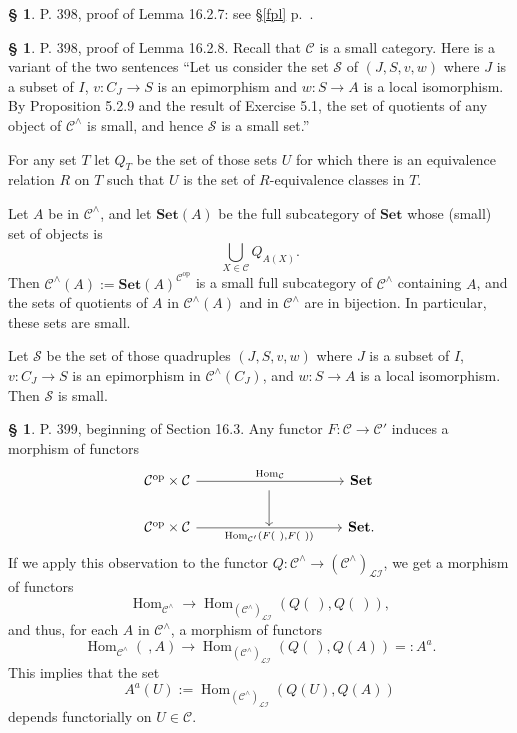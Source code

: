 \documentclass[12pt]{article}%
\theoremstyle{remark}
\theoremstyle{definition}
\newtheorem{s}[thm]{\S}%
\newcommand{\cc}{\mathcal}
\newcommand{\C}{\mathcal C}
\newcommand{\Set}{\mathbf{Set}}
\DeclareMathOperator{\Hom}{Hom}%
\DeclareMathOperator{\op}{op}
\begin{document}
%

\begin{s} 
P. 398, proof of Lemma 16.2.7: see \S\ref{fpl} p.~\pageref{fpl}.
\end{s}


%

\begin{s} 
P. 398, proof of Lemma 16.2.8. Recall that $\C$ is a small category. Here is a variant of the two sentences ``Let us consider the set $\cc S$ of $(J,S,v,w)$ where $J$ is a subset of $I$, $v:C_J\to S$ is an epimorphism and $w:S\to A$ is a local isomorphism. By Proposition 5.2.9 and the result of Exercise 5.1, the set of quotients of any object of $\C^\wedge$ is small, and hence $\cc S$ is a small set.'' 

For any set $T$ let $Q_T$ be the set of those sets $U$ for which there is an equivalence relation $R$ on $T$ such that $U$ is the set of $R$-equivalence classes in $T$. 

Let $A$ be in $\C^\wedge$, and let $\Set(A)$ be the full subcategory of $\Set$ whose (small) set of objects is 
$$
\bigcup_{X\in\C}Q_{A(X)}.
$$ 
Then $\C^\wedge(A):=\Set(A)^{\C^{\op}}$ is a small full subcategory of $\C^\wedge$ containing $A$, and the sets of quotients of $A$ in $\C^\wedge(A)$ and in $\C^\wedge$ are in bijection. In particular, these sets are small. 

Let $\cc S$ be the set of those quadruples $(J,S,v,w)$ where $J$ is a subset of $I$, $v:C_J\to S$ is an epimorphism in $\C^\wedge(C_J)$, and $w:S\to A$ is a local isomorphism. Then $\cc S$ is small.
\end{s}

%

\begin{s}%
P. 399, beginning of Section 16.3. Any functor $F:\C\to\C'$ induces a morphism of functors 
$$
\begin{tikzcd}
%
\C^{\op}\times\C\ar{rrrr}{\Hom_\C}&&\ar{d}&&\Set\\ 
\C^{\op}\times\C\ar{rrrr}[swap]{\Hom_{\C'}(F(\ ),F(\ ))}&&{}&&\Set.
%
\end{tikzcd}
$$
If we apply this observation to the functor $Q:\C^\wedge\to(\C^\wedge)_{\cc{LI}}$, we get a morphism of functors 
$$
\Hom_{\C^\wedge}\to\Hom_{(\C^\wedge)_{\cc{LI}}}(Q(\ ),Q(\ )),
$$ 
and thus, for each $A$ in $\C^\wedge$, a morphism of functors 
$$
\Hom_{\C^\wedge}(\ ,A)\to\Hom_{(\C^\wedge)_{\cc{LI}}}(Q(\ ),Q(A))=:A^a.
$$ 
This implies that the set 
$$
A^a(U):=\Hom_{(\C^\wedge)_{\cc{LI}}}(Q(U),Q(A))
$$ 
depends functorially on $U\in\C$.
\end{s}
\end{document}
